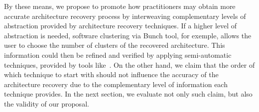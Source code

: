 

By these means, we propose to promote how practitioners may obtain more accurate architecture recovery process by interweaving complementary levels of abstraction provided by architecture recovery techniques. If a higher level of abstraction is needed, software clustering via Bunch tool, for exemple, allows the user to choose the number of clusters of the recovered architecture. This information could then be refined and verified by applying semi-automatic techniques, provided by tools like~\cite{VBDepend, Architexa, X-Ray}. On the other hand, we claim that the order of which technique to start with should not influence the accuracy of the architecture recovery due to the complementary level of information each technique provides. In the next section, we evaluate not only such claim, but also the validity of our proposal.